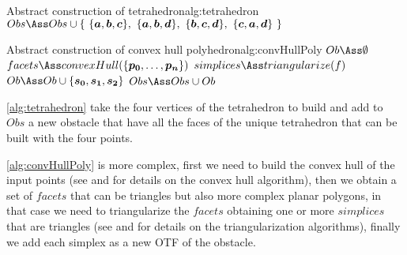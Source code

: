 \documentclass[dissertation.tex]{subfiles}
\begin{document}
\begin{algo}{Abstract construction of tetrahedron}{alg:tetrahedron}
  \State $Obs\Ass Obs\cup\{\ \{\ve{a},\ve{b},\ve{c}\},\ \{\ve{a},\ve{b},\ve{d}\},\ \{\ve{b},\ve{c},\ve{d}\},\ \{\ve{c},\ve{a},\ve{d}\}\ \}$
  \EndProcedure
\end{algo}
\begin{algo}{Abstract construction of convex hull
    polyhedron}{alg:convHullPoly}
  \State $Ob\Ass\emptyset$
  \State $facets\Ass convexHull(\{\ve{p_0},\dots,\ve{p_n}\})$
  \State $simplices\Ass triangularize(f)$
  \State $Ob\Ass Ob\cup\{\ve{s_0},\ve{s_1},\ve{s_2}\}$
  \EndFor
  \EndFor
  \State $Obs\Ass Obs\cup Ob$
  \EndProcedure
\end{algo}
\cref{alg:tetrahedron} take the four vertices of the tetrahedron to
build and add to $Obs$ a new obstacle that have all the faces of the
unique tetrahedron that can be built with the four
points.

\cref{alg:convHullPoly} is more complex, first we need to build the
convex hull of the input points (see \cite{deberg} and \cite{press}
for details on the 
convex hull algorithm), then we obtain a set of $facets$ that can be
triangles but also more complex planar polygons, in that case we need
to triangularize the $facets$ obtaining one or more $simplices$ that
are triangles (see \cite{deberg} and \cite{press} for details on the
triangularization
algorithms), finally we add each simplex as a new \ac{OTF} of the
obstacle.
\end{document}
